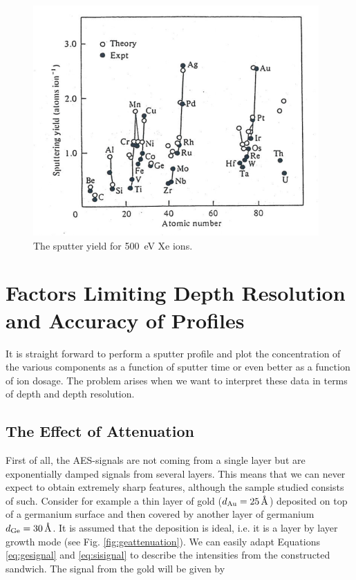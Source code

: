 \begin{figure}[h!]
	\begin{center}
	\includegraphics[scale=4]{figures/07_04.png}
	\caption{The sputter yield for \SI{500}{\electronvolt} Xe ions.}
	\label{fig:xesputteryield}
	\end{center}
\end{figure}

\section{Factors Limiting Depth Resolution and Accuracy of Profiles}
It is straight forward to perform a sputter profile and plot the concentration of the various components as a function of sputter time or even better as a function of ion dosage. The problem arises when we want to interpret these data in terms of depth and depth resolution.

\subsection{The Effect of Attenuation}
First of all, the AES-signals are not coming from a single layer but are exponentially damped signals from several layers. This means that we can never expect to obtain extremely sharp features, although the sample studied consists of such. Consider for example a thin layer of gold ($d_{\ce{Au}}=\SI{25}{\angstrom}$) deposited on top of a germanium surface and then covered by another layer of germanium $d_{\ce{Ge}}=\SI{30}{\angstrom}$. It is assumed that the deposition is ideal, i.e. it is a layer by layer growth mode (see Fig. \ref{fig:geattenuation}). We can easily adapt Equations \eqref{eq:gesignal} and \eqref{eq:sisignal} to describe the intensities from the constructed sandwich. The signal from the gold will be given by

